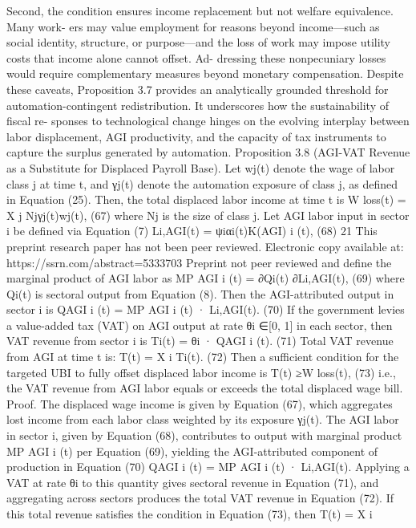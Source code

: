 Second, the condition ensures income replacement but not welfare equivalence. Many work-
ers may value employment for reasons beyond income—such as social identity, structure, or
purpose—and the loss of work may impose utility costs that income alone cannot offset. Ad-
dressing these nonpecuniary losses would require complementary measures beyond monetary
compensation.
Despite these caveats, Proposition 3.7 provides an analytically grounded threshold for
automation-contingent redistribution.
It underscores how the sustainability of fiscal re-
sponses to technological change hinges on the evolving interplay between labor displacement,
AGI productivity, and the capacity of tax instruments to capture the surplus generated by
automation.
Proposition 3.8 (AGI-VAT Revenue as a Substitute for Displaced Payroll Base). Let wj(t)
denote the wage of labor class j at time t, and γj(t) denote the automation exposure of class
j, as defined in Equation (25). Then, the total displaced labor income at time t is
W loss(t) =
X
j
Njγj(t)wj(t),
(67)
where Nj is the size of class j. Let AGI labor input in sector i be defined via Equation (7)
Li,AGI(t) = ψiαi(t)K(AGI)
i
(t),
(68)
21
This preprint research paper has not been peer reviewed. Electronic copy available at: https://ssrn.com/abstract=5333703
Preprint not peer reviewed
and define the marginal product of AGI labor as
MP AGI
i
(t) =
∂Qi(t)
∂Li,AGI(t),
(69)
where Qi(t) is sectoral output from Equation (8).
Then the AGI-attributed output in sector i is
QAGI
i
(t) = MP AGI
i
(t) · Li,AGI(t).
(70)
If the government levies a value-added tax (VAT) on AGI output at rate θi ∈[0, 1] in
each sector, then VAT revenue from sector i is
Ti(t) = θi · QAGI
i
(t).
(71)
Total VAT revenue from AGI at time t is:
T(t) =
X
i
Ti(t).
(72)
Then a sufficient condition for the targeted UBI to fully offset displaced labor income is
T(t) ≥W loss(t),
(73)
i.e., the VAT revenue from AGI labor equals or exceeds the total displaced wage bill.
Proof. The displaced wage income is given by Equation (67), which aggregates lost income
from each labor class weighted by its exposure γj(t). The AGI labor in sector i, given by
Equation (68), contributes to output with marginal product MP AGI
i
(t) per Equation (69),
yielding the AGI-attributed component of production in Equation (70)
QAGI
i
(t) = MP AGI
i
(t) · Li,AGI(t).
Applying a VAT at rate θi to this quantity gives sectoral revenue in Equation (71), and
aggregating across sectors produces the total VAT revenue in Equation (72). If this total
revenue satisfies the condition in Equation (73), then
T(t) =
X
i
